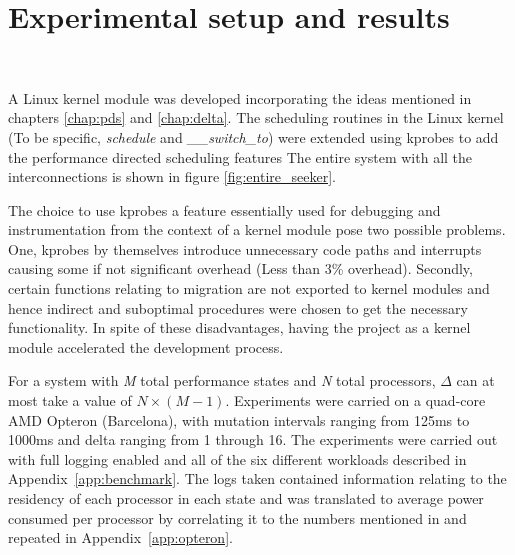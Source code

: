 \chapter{Experimental setup and results}~\label{chap:results}

A Linux kernel module was developed incorporating the ideas mentioned in chapters \ref{chap:pds}
and \ref{chap:delta}. The scheduling routines in the Linux kernel (To be specific, \textit{schedule} and \textit{\_\_switch\_to})
were extended using kprobes \cite{kprobes} to add the performance directed scheduling features
The entire system with all the interconnections is shown in figure \ref{fig:entire_seeker}.

The choice to use kprobes \cite{kprobes} a feature essentially used for debugging and instrumentation
from the context of a kernel module pose two possible 
problems. One, kprobes by themselves introduce unnecessary code paths and interrupts causing some
if not significant overhead (Less than 3\% overhead). Secondly, certain functions relating to migration are not exported
to kernel modules and hence indirect and suboptimal procedures were chosen to get the necessary 
functionality. In spite of these disadvantages, having the project as a kernel module accelerated 
the development process. 

For a system with \textit{M} total performance states and \textit{N} total processors, $\Delta$ can 
at most take a value of $N \times (M-1)$. Experiments were carried on a quad-core AMD Opteron (Barcelona),
with mutation intervals ranging from 125ms to 1000ms and delta ranging from 1 through 16. The experiments
were carried out with full logging enabled and all of the six different workloads described in Appendix~\ref{app:benchmark}. 
The logs taken contained information relating to the residency of each processor in each state and was 
translated to average power consumed per processor by correlating it to the numbers mentioned in \cite{AMDPow} and
repeated in Appendix~\ref{app:opteron}. 


